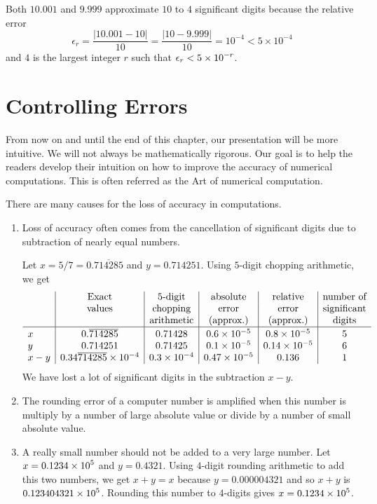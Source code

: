 \begin{egg}
Both $10.001$ and $9.999$ approximate $10$ to $4$ significant
digits because the relative error
\[
\epsilon_r = \frac{|10.001 - 10|}{10} = \frac{|10-9.999|}{10}
= 10^{-4} < 5 \times 10^{-4}
\]
and $4$ is the largest integer $r$ such that
$\displaystyle \epsilon_r < 5 \times 10^{-r}$.
\end{egg}

\section{Controlling Errors}

From now on and until the end of this chapter, our presentation will
be more intuitive.  We will not always be mathematically rigorous.
Our goal is to help the readers develop their intuition on how to
improve the accuracy of numerical computations.  This is often
referred as the Art of numerical computation.

There are many causes for the loss of accuracy in computations.

\begin{enumerate}
\item Loss of accuracy often comes from the cancellation of significant
digits due to subtraction of nearly equal numbers.

Let $x= 5/7 = 0.\overline{714285}$ and $y=0.714251$.  Using $5$-digit
chopping arithmetic, we get
\[
\begin{array}{l|c|c|c|c|c}
& \text{Exact} & \text{$5$-digit} & \text{absolute} & \text{relative} &
\text{number of} \\
& \text{values} & \text{chopping} & \text{error} & \text{error} &
\text{significant} \\
& & \text{arithmetic} & \text{(approx.)} & \text{(approx.)} & \text{digits} \\
\hline
x & \rule{0em}{1em} 0.\overline{714285} & 0.71428 & 0.6 \times 10^{-5} &
0.8 \times 10^{-5} & 5 \\
y & 0.714251 & 0.71425 & 0.1 \times 10^{-5} & 0.14\times 10^{-5} & 6 \\
x-y & 0.34\overline{714285}\times 10^{-4} & 0.3 \times 10^{-4} &
0.47\times 10^{-5} & 0.136 & 1
\end{array}
\]
We have lost a lot of significant digits in the subtraction $x-y$.
\item The rounding error of a computer number is amplified when this number
is multiply by a number of large absolute value or divide by a number of
small absolute value.
\item A really small number should not be added to a very large number.
Let $\displaystyle x= 0.1234 \times 10^5$ and $y=0.4321$.  Using
$4$-digit rounding
arithmetic to add this two numbers, we get $x+y=x$ because
$y=0.000004321$ and so $x+y$ is $\displaystyle 0.123404321 \times 10^5$.
Rounding this number to $4$-digits gives
$\displaystyle x = 0.1234 \times 10^5$.
\end{enumerate}

